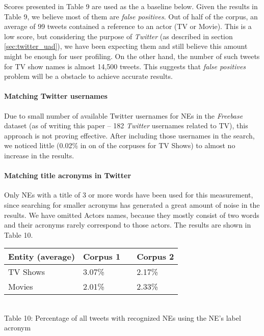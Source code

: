 Scores presented in Table 9 are used as the a baseline below. Given the results in Table 9, we believe
most of them are \textit{false positives}. Out of half of the corpus, an
average of 99 tweets contained a reference to an actor (TV or Movie). This is a low score, but considering the
purpose of \textit{Twitter} (as described in section \ref{sec:twitter_uad}), we have been expecting them and still believe this amount
might be enough for user profiling. On the other hand, the number of such tweets for TV show names is almost 14,500
tweets. This suggests that \textit{false positives} problem will be a obstacle to achieve accurate results.

\paragraph{Matching Twitter usernames}
Due to small number of available Twitter usernames for NEs in the \textit{Freebase} dataset (as of writing this
paper -- 182 \textit{Twitter} usernames related to TV), this approach is not proving effective. After including those
usernames in the search, we noticed little (0.02\% in on of the corpuses for TV Shows) to almost no increase in
the results.

\paragraph{Matching title acronyms in Twitter}
Only NEs with a title of 3 or more words have been used for this measurement, since searching
for smaller acronyms has generated a great amount of noise in the results. We have omitted Actors names, because
they mostly consist of two words and their acronyms rarely correspond to those actors. The results
are shown in Table 10.

\begin{center}
  \begin{tabular}{ | p{4cm} | p{2cm} | p{1cm}| p{2cm} | } \hline
    Entity (average) & Corpus 1 & & Corpus 2 \\ \hline
    TV Shows & 3.07\% & & 2.17\% \\ \hline
    Movies & 2.01\% & & 2.33\% \\ \hline
  \end{tabular} \\
  Table 10: Percentage of all tweets with recognized NEs using the NE's label acronym \\
\end{center}

